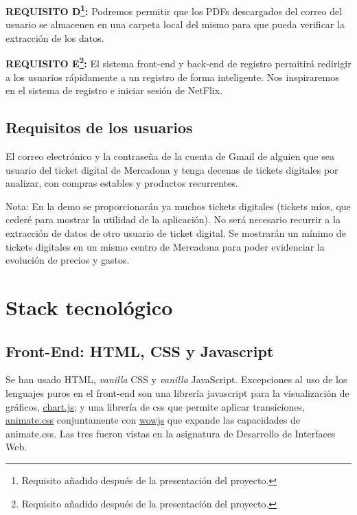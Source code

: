 \documentclass[a4paper,12pt]{report}
\begin{document}
			
			\textbf{REQUISITO D\footnote{Requisito añadido después de la presentación del proyecto.}:} Podremos permitir que los PDFs descargados del correo del usuario se almacenen en una carpeta local del mismo para que pueda verificar la extracción de los datos.
			
			\textbf{REQUISITO E\footnote{Requisito añadido después de la presentación del proyecto.}:} El sistema front-end y back-end de registro permitirá redirigir a los usuarios rápidamente a un registro de forma inteligente. Nos inspiraremos en el sistema de  registro e iniciar sesión de NetFlix.
			
			\subsection{Requisitos de los usuarios}
			
			El correo electrónico y la contraseña de la cuenta de Gmail de alguien que sea usuario del ticket digital de Mercadona y tenga decenas de tickets digitales por analizar, con compras estables y productos recurrentes.
			
			Nota: En la demo se proporcionarán ya muchos tickets digitales (tickets míos, que cederé para mostrar la utilidad de la aplicación). No será necesario recurrir a la extracción de datos de otro usuario de ticket digital. Se mostrarán un mínimo de tickets digitales en un mismo centro de Mercadona para poder evidenciar la evolución de precios y gastos.
			
		
		\section{Stack tecnológico}
	
		
			 \subsection{Front-End: HTML, CSS y Javascript}
			 
			Se han usado HTML, \textit{vanilla} CSS y \textit{vanilla} JavaScript. Excepciones al uso de los lenguajes puros en el front-end son una librería javascript para la visualización de gráficos, \href{https://www.chartjs.org/}{chart.js}\cite{chartjs}; y una librería de css que permite aplicar transiciones, \href{https://animate.style/}{animate.css}\cite{animatecss} conjuntamente con \href{https://wowjs.uk/}{wowjs}\cite{wowjs} que expande las capacidades de animate.css. Las tres fueron vistas en la asignatura de Desarrollo de Interfaces Web.
			
\end{document}
